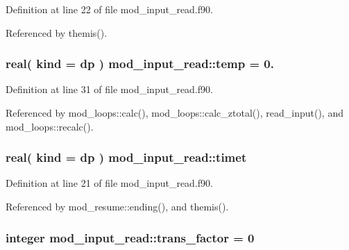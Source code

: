 Definition at line 22 of file mod\+\_\+input\+\_\+read.\+f90.



Referenced by themis().

\subsubsection[{\texorpdfstring{temp}{temp}}]{\setlength{\rightskip}{0pt plus 5cm}real( kind = dp ) mod\+\_\+input\+\_\+read\+::temp = 0.}\hypertarget{namespacemod__input__read_a41af319bbc9c366863fee70f87f590a0}{}\label{namespacemod__input__read_a41af319bbc9c366863fee70f87f590a0}


Definition at line 31 of file mod\+\_\+input\+\_\+read.\+f90.



Referenced by mod\+\_\+loops\+::calc(), mod\+\_\+loops\+::calc\+\_\+ztotal(), read\+\_\+input(), and mod\+\_\+loops\+::recalc().

\subsubsection[{\texorpdfstring{timet}{timet}}]{\setlength{\rightskip}{0pt plus 5cm}real( kind = dp ) mod\+\_\+input\+\_\+read\+::timet}\hypertarget{namespacemod__input__read_a5ccab548b1c0f51bdd20cc9251e4dedb}{}\label{namespacemod__input__read_a5ccab548b1c0f51bdd20cc9251e4dedb}


Definition at line 21 of file mod\+\_\+input\+\_\+read.\+f90.



Referenced by mod\+\_\+resume\+::ending(), and themis().

\subsubsection[{\texorpdfstring{trans\+\_\+factor}{trans_factor}}]{\setlength{\rightskip}{0pt plus 5cm}integer mod\+\_\+input\+\_\+read\+::trans\+\_\+factor = 0}\hypertarget{namespacemod__input__read_a0c42ae57c5b1cbe6dbbb2cf1691525ce}{}\label{namespacemod__input__read_a0c42ae57c5b1cbe6dbbb2cf1691525ce}


